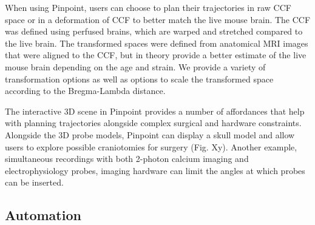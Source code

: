 When using Pinpoint, users can choose to plan their trajectories in raw CCF space or in a deformation of CCF to better match the live mouse brain. The CCF was defined using perfused brains, which are warped and stretched compared to the live brain. The transformed spaces were defined from anatomical MRI images that were aligned to the CCF, but in theory provide a better estimate of the live mouse brain depending on the age and strain. We provide a variety of transformation options as well as options to scale the transformed space according to the Bregma-Lambda distance.


The interactive 3D scene in Pinpoint provides a number of affordances that help with planning trajectories alongside complex surgical and hardware constraints. Alongside the 3D probe models, Pinpoint can display a skull model and allow users to explore possible craniotomies for surgery (Fig. Xy). Another example, simultaneous recordings with both 2-photon calcium imaging and electrophysiology probes, imaging hardware can limit the angles at which probes can be inserted.


\subsection{Automation}



